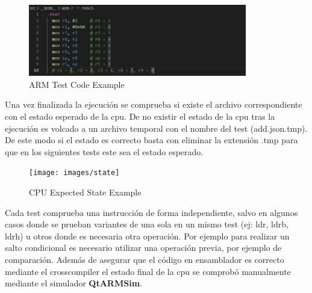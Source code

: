 {        \begin{figure}[h]
         \centering
            \includegraphics[width=0.85\textwidth]{images/asm}
            \caption{ARM Test Code Example}
        \end{figure}

        \newpage
        Una vez finalizada la ejecución se comprueba si existe el archivo correspondiente con el estado esperado de la cpu.
        De no existir el estado de la cpu tras la ejecución es volcado a un archivo temporal con el nombre del test (add.json.tmp).
        De este modo si el estado es correcto basta con eliminar la extensión .tmp para que en los siguientes tests este sea el estado esperado.
    
        \begin{figure}[h]
         \centering
            \texttt{[image: images/state]}
            \caption{CPU Expected State Example}
        \end{figure}
        
        Cada test comprueba una instrucción de forma independiente, salvo en algunos casos donde se prueban variantes de una sola en un mismo test (ej: ldr, ldrb, ldrh) u otros
        donde es necesaria otra operación. Por ejemplo para realizar un salto condicional es necesario utilizar una operación previa, por ejemplo de comparación.
        Además de asegurar que el código en ensamblador es correcto mediante el crosscompiler el estado final
        de la cpu se comprobó manualmente mediante el simulador \textbf{QtARMSim}.        
    }
    
